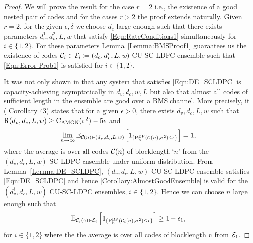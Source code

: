 \begin{proof}
We will prove the result for the case $r=2$ i.e., the existence of a good nested pair of codes and for the cases $r>2$ the  proof extends naturally. Given $r=2$, for the given $\epsilon,\delta$ we choose $d_{c}$ large enough such that there exists parameters $d_{v}^{1},d_{v}^{2},L,w$ that satisfy \eqref{Eqn:RateConditions1} simultaneously for $i \in\{1,2\}$. For these parameters Lemma~\ref{Lemma:BMSProof1} guarantees us the existence of codes $\mathcal{C}_{i}\in\mathcal{E}_{i}\mathrel{\mathop:}= (d_{c},d_{v}^{i},L,w)$ CU-SC-LDPC ensemble such that \eqref{Eqn:Error Prob1} is satisfied for $i\in\{1,2\}$.

It was not only shown in \cite{kudekaruniversal} that any system that satisfies \eqref{Eqn:DE_SCLDPC} is capacity-achieving  asymptotically in $d_{v},d_{c},w,L$ but also that almost all codes of sufficient length in the ensemble are good over a BMS channel. More precisely, it (\cite{kudekaruniversal} Corollary 43) states that for a given $\epsilon >0$, there exists $d_{v},d_{c}, L,w$ such that $\text{R}(d_{v},d_{c},L,w)\geq \text{C}_{\text{AMGN}}(\sigma^{2})-5\epsilon$ and
\begin{align}
\lim_{n\rightarrow\infty}\mbb{E}_{\mc{C}(n)\in(d_{v},d_{c},L,w)}\left[ \ind_{\{\tx{P}_{\tx{b}}^{\tx{BP}}\left(\mc{C}(n),\sigma^{2}\right)\leq \epsilon\}}\right]=1,
\label{Corollary:AlmostGoodEnsemble}
\end{align}
where the average is over all codes $\mathcal{C}(n)$ of blocklength `$n$' from the $(d_{v},d_{c},L,w)$ SC-LDPC ensemble under uniform distribution. From Lemma~\ref{Lemma:DE_SCLDPC}, $(d_{v},d_{c},L,w)$ CU-SC-LDPC ensemble satisfies \eqref{Eqn:DE_SCLDPC} and hence \eqref{Corollary:AlmostGoodEnsemble} is valid for the $(d_{v}^{i},d_{c},L,w)$ CU-SC-LDPC ensembles, $i\in\{1,2\}$. Hence we can choose $n$ large enough such that 
\begin{align}
\mbb{E}_{\mc{C}_{i}(n)\in \mc{E}_{i}}\left[	 \ind_{\{\tx{P}_{\tx{b}}^{\tx{BP}}\left(\mc{C}_{i}(n),\sigma^{2}\right)\leq \epsilon\}}\right]\geq 1-\epsilon_{1},
\label{Eqn:Proof1.1}
\end{align}
for $i\in \{1,2\}$ where  the the average is over all codes of blocklength $n$ from $\mathcal{E}_{1}$.


\end{proof}
